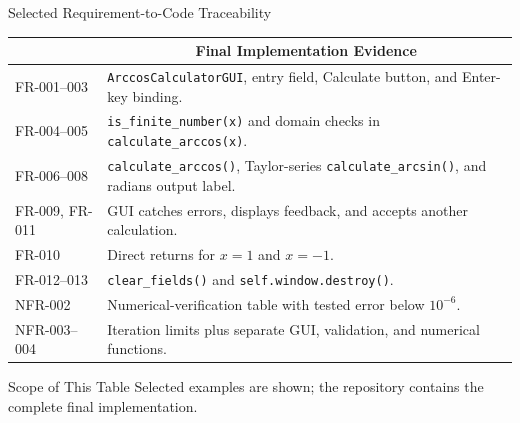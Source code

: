 \documentclass[aspectratio=169]{beamer}
\newcommand{\tableheader}[1]{%
    \multicolumn{1}{c}{\color{white}\textbf{#1}}%
}
\begin{document}
\begin{frame}{Selected Requirement-to-Code Traceability}
\scriptsize
{}
\begin{tabular}{p{}p{}}
\rowcolor{navy}
\tableheader{Requirement} & \tableheader{Final Implementation Evidence} \\
\toprule
FR-001--003 & \texttt{ArccosCalculatorGUI}, entry field, Calculate button, and Enter-key binding. \\
FR-004--005 & \texttt{is\_finite\_number(x)} and domain checks in \texttt{calculate\_arccos(x)}. \\
FR-006--008 & \texttt{calculate\_arccos()}, Taylor-series \texttt{calculate\_arcsin()}, and radians output label. \\
FR-009, FR-011 & GUI catches errors, displays feedback, and accepts another calculation. \\
FR-010 & Direct returns for \(x=1\) and \(x=-1\). \\
FR-012--013 & \texttt{clear\_fields()} and \texttt{self.window.destroy()}. \\
NFR-002 & Numerical-verification table with tested error below \(10^{-6}\). \\
NFR-003--004 & Iteration limits plus separate GUI, validation, and numerical functions. \\
\bottomrule
\end{tabular}

\vspace{0.20cm}

\begin{block}{Scope of This Table}
Selected examples are shown; the repository contains the complete final implementation.
\end{block}
\end{frame}
\end{document}
